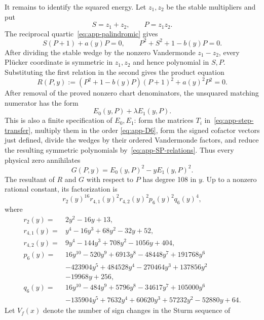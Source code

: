It remains to identify the squared energy.  Let \(z_1,z_2\) be the stable
multipliers and put
\[
 S=z_1+z_2,\qquad P=z_1z_2.
\]
The reciprocal quartic~\eqref{eq:app-palindromic} gives
\begin{equation}
 S(P+1)+a(y)P=0,\qquad
 P^2+S^2+1-b(y)P=0.                  \label{eq:app-SP-relations}
\end{equation}
After dividing the stable wedge by the nonzero Vandermonde
\(z_1-z_2\), every Pl\"ucker coordinate is symmetric in \(z_1,z_2\) and
hence polynomial in \(S,P\).  Substituting the first relation in the
second gives the product equation
\begin{equation}
 R(P,y):=(P^2+1-b(y)P)(P+1)^2+a(y)^2P^2=0.            \label{eq:app-product-relation}
\end{equation}
After removal of the proved nonzero chart denominators, the unsquared
matching numerator has the form
\[
 E_0(y,P)+\lambda E_1(y,P).
\]
This is also a finite specification of \(E_0,E_1\): form the matrices
\(T_i\) in~\eqref{eq:app-step-transfer}, multiply them in the order
\eqref{eq:app-D6}, form the signed cofactor vectors just defined, divide the
wedges by their ordered Vandermonde factors, and reduce the resulting
symmetric polynomials by~\eqref{eq:app-SP-relations}.
Thus every physical zero annihilates
\begin{equation}
 G(P,y)=E_0(y,P)^2-yE_1(y,P)^2.                       \label{eq:app-squared-Evans}
\end{equation}
The resultant of \(R\) and \(G\) with respect to \(P\) has degree 108 in
\(y\). Up to a nonzero rational constant, its factorization is
\begin{equation}
 r_2(y)^{16}r_{4,1}(y)^2r_{4,2}(y)^2p_6(y)^2q_6(y)^4, \label{eq:app-resultant-factorization}
\end{equation}
where
\begin{align*}
r_2(y)={}&2y^2-16y+13,\\
r_{4,1}(y)={}&y^4-16y^3+68y^2-32y+52,\\
r_{4,2}(y)={}&9y^4-144y^3+708y^2-1056y+404,\\
p_6(y)={}&16y^{10}-520y^9+6913y^8-48448y^7+191768y^6\\
&-423904y^5+484528y^4-270464y^3+137856y^2\\
&-19968y+256,\\
q_6(y)={}&16y^{10}-484y^9+5796y^8-34617y^7+105000y^6\\
&-135904y^5+7632y^4+60620y^3+57232y^2-52880y+64.
\end{align*}
Let \(V_f(x)\) denote the number of sign changes in the Sturm sequence of

